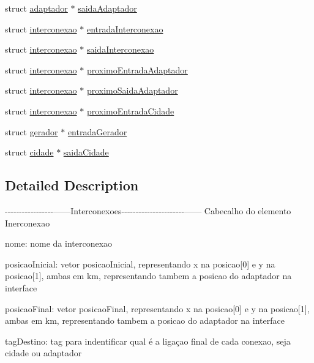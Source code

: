 \begin{DoxyCompactItemize}
\item 
struct \hyperlink{structadaptador}{adaptador} $\ast$ \hyperlink{structinterconexao_a89f6d0b2c88bb33283e80d439c01c575}{saida\-Adaptador}
\item 
struct \hyperlink{structinterconexao}{interconexao} $\ast$ \hyperlink{structinterconexao_a4e737e84160630dcb4b4a314d068361d}{entrada\-Interconexao}
\item 
struct \hyperlink{structinterconexao}{interconexao} $\ast$ \hyperlink{structinterconexao_ab5e0438b9abf57d318825660da5cb279}{saida\-Interconexao}
\item 
struct \hyperlink{structinterconexao}{interconexao} $\ast$ \hyperlink{structinterconexao_a3378cab97ff6faca1fed5284f60899ee}{proximo\-Entrada\-Adaptador}
\item 
struct \hyperlink{structinterconexao}{interconexao} $\ast$ \hyperlink{structinterconexao_a0f78c20456e02f17b9c66806392b7f80}{proximo\-Saida\-Adaptador}
\item 
struct \hyperlink{structinterconexao}{interconexao} $\ast$ \hyperlink{structinterconexao_a12754d0ee6ed8698342735cb34b9abae}{proximo\-Entrada\-Cidade}
\item 
struct \hyperlink{structgerador}{gerador} $\ast$ \hyperlink{structinterconexao_a84fba959cbecb5e3c55e9bd2907c8a82}{entrada\-Gerador}
\item 
struct \hyperlink{structcidade}{cidade} $\ast$ \hyperlink{structinterconexao_aa1457ad6c3cc7f9f64db35f10bda7133}{saida\-Cidade}
\end{DoxyCompactItemize}


\subsection{Detailed Description}
-\/-\/-\/-\/-\/-\/-\/-\/-\/-\/-\/-\/-\/-\/-\/-\/-\/------Interconexoes-\/-\/-\/-\/-\/-\/-\/-\/-\/-\/-\/-\/-\/-\/-\/-\/-\/-\/-\/-\/-\/-\/------ Cabecalho do elemento Inerconexao

nome\-: nome da interconexao

posicao\-Inicial\-: vetor posicao\-Inicial, representando x na posicao\mbox{[}0\mbox{]} e y na posicao\mbox{[}1\mbox{]}, ambas em km, representando tambem a posicao do adaptador na interface

posicao\-Final\-: vetor posicao\-Final, representando x na posicao\mbox{[}0\mbox{]} e y na posicao\mbox{[}1\mbox{]}, ambas em km, representando tambem a posicao do adaptador na interface

tag\-Destino\-: tag para indentificar qual é a ligaçao final de cada conexao, seja cidade ou adaptador

